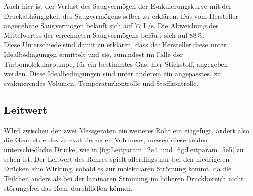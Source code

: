 Auch hier ist der Verlust des Saugvermögen der Evakuierungskurve mit der Druckabhängigkeit des Saugvermögens selber zu erklären.
Das vom Hersteller angegebene Saugvermögen beläuft sich auf $\SI{77}{\liter\per\second}$. \cite{delta_tu_dortmund}
Die Abweichung des Mittelwertes der errechneten Saugvermögens beläuft sich auf $\num{88}\%$. \\

Diese Unterschiede sind damit zu erklären, dass der Hersteller diese unter Idealbedingungen ermittelt und sie, zumindest im Falle der Turbomolekularpumpe,
für ein bestimmtes Gas, hier Stickstoff, angegeben werden. Diese Idealbedingungen sind unter anderem ein angepasstes, zu evakuierendes Volumen, Temperaturkontrolle und Stoffkontrolle.

\subsection{Leitwert}

WIrd zwischen den zwei Messgeräten ein weiteres Rohr ein eingefügt, ändert also die Geometrie des zu evakuierenden Volumens,
messen diese beiden unterschiedliche Drücke, wie in \ref{fig:Leitparam_2e4} und \ref{fig:Leitparam_5e5} zu sehen ist.
Der Leitwert des Rohres spielt allerdings nur bei den niedrigeren Drücken eine Wirkung, sobald es zur molekularen Strömung kommt,
da die Teilchen anders als bei der laminaren Strömung im höheren Druckbereich nicht störungsfrei das Rohr durchfließen können. \\
